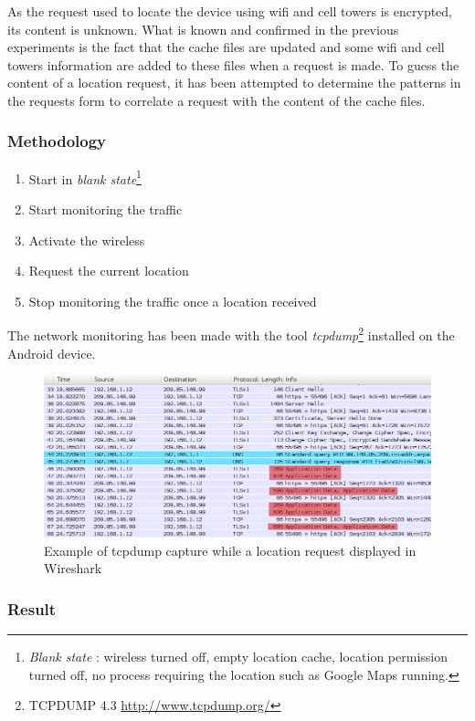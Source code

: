 As the request used to locate the device using wifi and cell towers is encrypted, its content is unknown.
What is known and confirmed in the previous experiments is the fact that the cache files are updated and some wifi and cell towers information are added to these files when a request is made.
To guess the content of a location request, it has been attempted to determine the patterns in the requests form to correlate a request with the content of the cache files.

\subsubsection{Methodology}

\begin{enumerate}
\item Start in \emph{blank state}\footnote{\emph{Blank state} : wireless turned off, empty location cache, location permission turned off, no process requiring the location such as Google Maps running.}
\item Start monitoring the traffic
\item Activate the wireless
\item Request the current location
\item Stop monitoring the traffic once a location received
\end{enumerate}

The network monitoring has been made with the tool \emph{tcpdump}\footnote{TCPDUMP 4.3 \url{http://www.tcpdump.org/}} installed on the Android device.

\begin{figure}[h]
  \centering
  \includegraphics[width=\textwidth]{images/trace2.png}
  \caption{Example of tcpdump capture while a location request displayed in Wireshark}
  \label{fig:loc-req-tcpdump}
\end{figure}

\subsubsection{Result}

